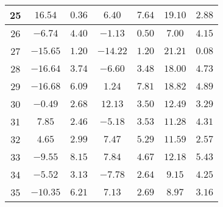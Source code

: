 \begin{table}[H]
\begin{tabular}{|c|c|c|c|c|c|c|}
                        25  &   $16.54$  &  $0.36$   &  $6.40$    &  $7.64$   &  $19.10$  & $2.88$  \\ \hline
                        26  &   $-6.74$  &  $4.40$   &  $-1.13$   &  $0.50$   &  $7.00$   & $4.15$  \\ \hline
                        27  &   $-15.65$ &  $1.20$   &  $-14.22$  &  $1.20$   &  $21.21$  & $0.08$  \\ \hline
                        28  &   $-16.64$ &  $3.74$   &  $-6.60$   &  $3.48$   &  $18.00$  & $4.73$  \\ \hline
                        29  &   $-16.68$ &  $6.09$   &  $1.24$    &  $7.81$   &  $18.82$  & $4.89$  \\ \hline
                        30  &   $-0.49$  &  $2.68$   &  $12.13$   &  $3.50$   &  $12.49$  & $3.29$  \\ \hline
                        31  &   $7.85$   &  $2.46$   &  $-5.18$   &  $3.53$   &  $11.28$  & $4.31$  \\ \hline
                        32  &   $4.65$   &  $2.99$   &  $7.47$    &  $5.29$   &  $11.59$  & $2.57$  \\ \hline
                        33  &   $-9.55$  &  $8.15$   &  $7.84$    &  $4.67$   &  $12.18$  & $5.43$  \\ \hline
                        34  &   $-5.52$  &  $3.13$   &  $-7.78$   &  $2.64$   &  $9.15$   & $4.25$  \\ \hline
                        35  &   $-10.35$ &  $6.21$   &  $7.13$    &  $2.69$   &  $8.97$   & $3.16$  \\ \hline
        \end{tabular}
    \label{tab:media_fisica_4_espiral}    
\end{table}

